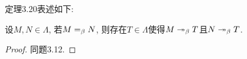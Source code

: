 定理3.20表述如下:

设$M,N\in\Lambda$, 若$M=_{\beta} N$, 则存在$T\in\Lambda$使得$M\twoheadrightarrow_{\beta} T$且$N\twoheadrightarrow_{\beta} T$.
\begin{proof}
    同题3.12.
\end{proof}